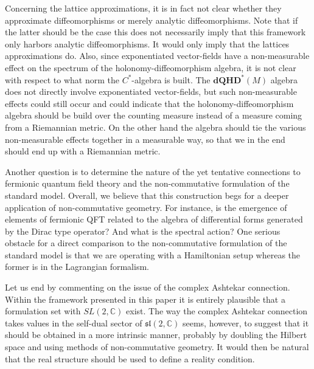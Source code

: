\documentclass[12pt]{article}
\begin{document}
Concerning the lattice approximations, it is in fact not clear %
 whether they approximate diffeomorphisms or merely analytic diffeomorphisms. Note that if the latter should be the case this does not necessarily imply that this framework only harbors analytic diffeomorphisms. It would only imply that the lattices approximations do. Also, since exponentiated vector-fields have a non-measurable effect on the spectrum of the holonomy-diffeomorphism algebra, it is not clear %
 with respect to what norm the $C^*$-algebra is built. The $\mathbf{dQHD}^*(M) $ algebra does not directly involve exponentiated vector-fields, but such non-measurable effects could still occur and could indicate that the holonomy-diffeomorphism algebra should be build over the counting measure instead of a measure coming from a Riemannian metric. On the other hand  the algebra should tie the various non-measurable effects together in a measurable way, so that we in the end should end up with a Riemannian metric.   


Another question is to determine the nature of the yet tentative connections to fermionic quantum field theory and the non-commutative formulation of the standard model. Overall, we believe that this construction begs for a deeper application of non-commutative geometry.  For instance, is the emergence of elements of fermionic QFT related to the algebra of differential forms generated by the Dirac type operator? And what is the spectral action? One serious obstacle for a direct comparison to the non-commutative formulation of the standard model is that we are operating with a Hamiltonian setup whereas the former is in the Lagrangian formalism.







Let us end by commenting on the issue of the complex Ashtekar connection. Within the framework presented in this paper it is entirely plausible that a formulation set with $SL(2,\mathbb{C})$ exist. The way the complex Ashtekar connection takes values in the self-dual sector of $\mathfrak{sl}(2,\mathbb{C})$ seems, however, to suggest that it should be obtained in a more intrinsic manner, probably by doubling the Hilbert space and using methods of non-commutative geometry. It would then be natural that the real structure should be used to define a reality condition. %
\end{document}
